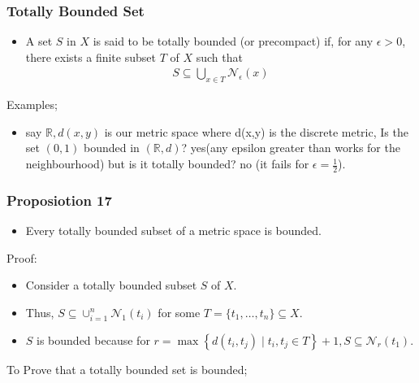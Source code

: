 \documentclass[12pt,a4paper]{article}
\begin{document}
 \subsubsection{Totally Bounded Set} 
\begin{itemize}
    \item  A set \(S\) in \(X\) is said to be totally bounded (or precompact) if, for any \(\epsilon>0\), there exists a finite subset \(T\) of \(X\) such that
    \begin{align*}
    S \subseteq \bigcup_{x \in T} \mathcal{N}_\epsilon(x)
    \end{align*}
\end{itemize}
Examples;
\begin{itemize}
    \item say \(\mathbb{R},d(x,y)\) is our metric space where d(x,y) is the discrete metric, Is the set \((0,1)\) bounded in \((\mathbb{R},d)\)? yes(any epsilon greater than works for the neighbourhood) but is it totally bounded? no (it fails for \(\epsilon=\frac{1}{2}\)).
\end{itemize}
 
\subsubsection{Proposiotion 17} 
\begin{itemize}
    \item Every totally bounded subset of a metric space is bounded.
\end{itemize}
Proof:
\begin{itemize}
    \item Consider a totally bounded subset \(S\) of \(X\).
    \item Thus, \(S \subseteq \cup_{i=1}^n \mathcal{N}_1\left(t_i\right)\) for some \(T=\{ t_1, \ldots, t_n \} \subseteq X\).
    \item \(S\) is bounded because for \(r=\max \left\{d\left(t_i, t_j\right) \mid t_i, t_j \in T\right\}+1, S \subseteq \mathcal{N}_r\left(t_1\right)\).
\end{itemize}

To Prove that a totally bounded set is bounded;
\end{document}
